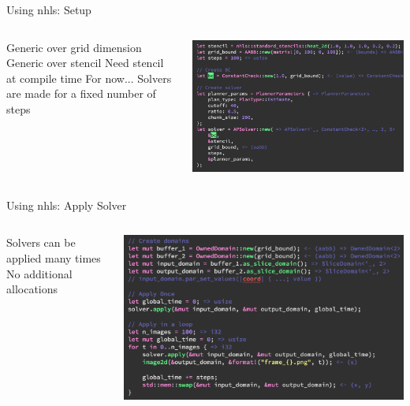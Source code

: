\begin{frame}{Using nhls: Setup}
  \begin{columns}
  \begin{outline}
  \1 Generic over grid dimension 
  \1 Generic over stencil
  \1 Need stencil at compile time
  \2 For now...
  \1 Solvers are made for a fixed number of steps
  \end{outline}

  \begin{center}
  \centering
  \includegraphics[width=\textwidth]{nhls_setup.png}
  \end{center}
\end{columns}
\end{frame}

\begin{frame}{Using nhls: Apply Solver}
  \begin{columns}
  \begin{outline}
  \1 Solvers can be applied many times 
  \1 No additional allocations 
  \end{outline}

  \begin{center}
  \centering
  \includegraphics[width=\textwidth]{nhls_solver.png}
  \end{center}
\end{columns}
\end{frame}

